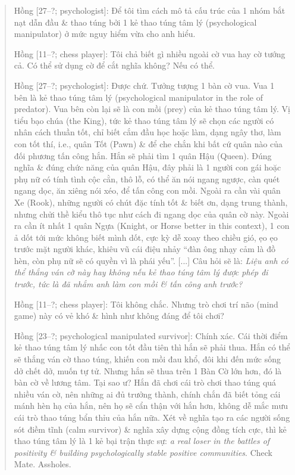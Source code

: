 \documentclass[12pt]{article}
\begin{document}
\begin{quote}
	{\sf Hồng [27--?; psychologist]}: Để tôi tìm cách mô tả cấu trúc của 1 nhóm bắt nạt dẫn đầu \& thao túng bởi 1 kẻ thao túng tâm lý (psychological manipulator) ở mức nguy hiểm vừa cho anh hiểu.
	
	{\sf Hồng [11--?; chess player]}: Tôi chả biết gì nhiều ngoài cờ vua hay cờ tướng cả. Có thể sử dụng cờ để cắt nghĩa không? Nếu có thể.
	
	{\sf Hồng [27--?; psychologist]}: Được chứ. Tưởng tượng 1 bàn cờ vua. Vua 1 bên là kẻ thao túng tâm lý (psychological manipulator in the role of predator). Vua bên còn lại sẽ là con mồi (prey) của kẻ thao túng tâm lý. Vị tiểu bạo chúa (the King), tức kẻ thao túng tâm lý sẽ chọn các người có nhân cách thuần tốt, chỉ biết cắm đầu học hoặc làm, dạng ngây thơ, làm con tốt thí, i.e., quân Tốt (Pawn) \& để che chắn khi bất cứ quân nào của đối phương tấn công hắn. Hắn sẽ phải tìm 1 quân Hậu (Queen). Đúng nghĩa \& đúng chức năng của quân Hậu, đây phải là 1 người con gái hoặc phụ nữ có tính tình cộc cằn, thô lỗ, có thể ăn nói ngang ngược, càn quét ngang dọc, ăn xiêng nói xéo, để tấn công con mồi. Ngoài ra cần vài quân Xe (Rook), những người có chút đặc tính tốt \& biết ơn, dạng trung thành, nhưng chửi thề kiểu thô tục như cách đi ngang dọc của quân cờ này. Ngoài ra cần ít nhất 1 quân Ngựa (Knight, or Horse better in this context), 1 con ả dốt tới mức không biết mình dốt, cực kỳ dễ xoay theo chiều gió, ẹo ẹo trước mặt người khác, khiêu vũ cái điệu nhảy ``đàn ông nhạy cảm là đồ hèn, còn phụ nữ sẽ có quyền vì là phái yếu''. [...] Câu hỏi sẽ là: {\it Liệu anh có thể thắng ván cờ này hay không nếu kẻ thao túng tâm lý được phép đi trước, tức là đã nhắm anh làm con mồi \& tấn công anh trước?}
	
	{\sf Hồng [11--?; chess player]}: Tôi không chắc. Nhưng trò chơi trí não (mind game) này có vẻ khó \& hình như không đáng để tôi chơi?
	
	{\sf Hồng [23--?; psychological manipulated survivor]}: Chính xác. Cái thời điểm kẻ thao túng tâm lý nhấc con tốt đầu tiên thì hắn sẽ phải thua. Hắn có thể sẽ thắng ván cờ thao túng, khiến con mồi đau khổ, đôi khi đến mức sống dở chết dở, muốn tự tử. Nhưng hắn sẽ thua trên 1 Bàn Cờ lớn hơn, đó là bàn cờ về lương tâm. Tại sao ư? Hắn đã chơi cái trò chơi thao túng quá nhiều ván cờ, nên những ai đủ trưởng thành, chính chắn đã biết tỏng cái mánh hèn hạ của hắn, nên họ sẽ cẩn thận với hắn hơn, không dễ mắc mưu cái trò thao túng bẩn thỉu của hắn nữa. Xét về nghĩa tạo ra các người sống sót điềm tĩnh (calm survivor) \& nghĩa xây dựng cộng đồng tích cực, thì kẻ thao túng tâm lý là 1 kẻ bại trận thực sự: {\it a real loser in the battles of positivity \& building psychologically stable positive communities}. Check Mate. Assholes.
\end{quote}
\end{document}
